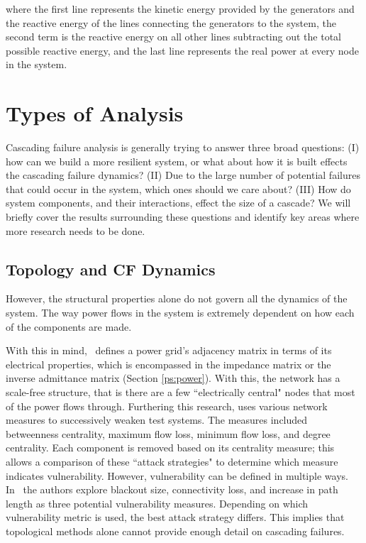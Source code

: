 where the first line represents the kinetic energy provided by the generators and the reactive energy of the lines connecting the generators to the system, the second term is the reactive energy on all other lines subtracting out the total possible reactive energy, and the last line represents the real power at every node in the system.

\section{Types of Analysis}
Cascading failure analysis is generally trying to answer three broad questions: (I) how can we build a more resilient system, or what about how it is built effects the cascading failure dynamics?  (II) Due to the large number of potential failures that could occur in the system, which ones should we care about?  (III) How do system components, and their interactions, effect the size of a cascade?  We will briefly cover the results surrounding these questions and identify key areas where more research needs to be done.

\subsection{Topology and CF Dynamics}

However, the structural properties alone do not govern all the dynamics of the system.  The way power flows in the system is extremely dependent on how each of the components are made.  

  With this in mind,~\cite{electrical_betweenness} defines a power grid's adjacency matrix in terms of its electrical properties, which is encompassed in the impedance matrix or the inverse admittance matrix (Section \ref{ps:power}).  With this, the network has a scale-free structure, that is there are a few ``electrically central" nodes that most of the power flows through.  Furthering this research, \cite{topology_good} uses various network measures to successively weaken test systems.  The measures included betweenness centrality, maximum flow loss, minimum flow loss, and degree centrality.  Each component is removed based on its centrality measure; this allows a comparison of these ``attack strategies" to determine which measure indicates vulnerability.  However, vulnerability can be defined in multiple ways.  In~\cite{topology_good} the authors explore blackout size, connectivity loss, and increase in path length as three potential vulnerability measures.  Depending on which vulnerability metric is used, the best attack strategy differs.  This implies that topological methods alone cannot provide enough detail on cascading failures.
  
